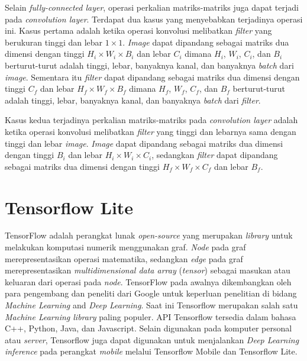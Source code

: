 Selain \textit{fully-connected layer}, operasi perkalian matriks-matriks juga dapat terjadi pada \textit{convolution layer}. Terdapat dua kasus yang menyebabkan terjadinya operasi ini. Kasus pertama adalah ketika operasi konvolusi melibatkan \textit{filter} yang berukuran tinggi dan lebar $1 \times 1$. \textit{Image} dapat dipandang sebagai matriks dua dimensi dengan tinggi $H_{i} \times W_{i} \times B_{i}$ dan lebar $C_{i}$ dimana $H_{i}$, $W_{i}$, $C_{i}$, dan $B_{i}$ berturut-turut adalah tinggi, lebar, banyaknya kanal, dan banyaknya \textit{batch} dari \textit{image}. Sementara itu \textit{filter} dapat dipandang sebagai matriks dua dimensi dengan tinggi $C_{f}$ dan lebar $H_{f} \times W_{f} \times B_{f}$ dimana $H_{f}$, $W_{f}$, $C_{f}$, dan $B_{f}$ berturut-turut adalah tinggi, lebar, banyaknya kanal, dan banyaknya \textit{batch} dari \textit{filter}.

Kasus kedua terjadinya perkalian matriks-matriks pada \textit{convolution layer} adalah ketika operasi konvolusi melibatkan \textit{filter} yang tinggi dan lebarnya sama dengan tinggi dan lebar \textit{image}. \textit{Image} dapat dipandang sebagai matriks dua dimensi dengan tinggi $B_{i}$ dan lebar $H_{i} \times W_{i} \times C_{i}$, sedangkan \textit{filter} dapat dipandang sebagai matriks dua dimensi dengan tinggi $H_{f} \times W_{f} \times C_{f}$ dan lebar $B_{f}$.

\section{Tensorflow Lite}
TensorFlow \cite{tensorflow} adalah perangkat lunak \textit{open-source} yang merupakan \textit{library} untuk melakukan komputasi numerik menggunakan graf. \textit{Node} pada graf merepresentasikan operasi matematika, sedangkan \textit{edge} pada graf merepresentasikan \textit{multidimensional data array} (\textit{tensor}) sebagai masukan atau keluaran dari operasi pada \textit{node}. TensorFlow pada awalnya dikembangkan oleh para pengembang dan peneliti dari Google untuk keperluan penelitian di bidang \textit{Machine Learning} and \textit{Deep Learning}. Saat ini Tensorflow merupakan salah satu \textit{Machine Learning library} paling populer. API Tensorflow tersedia dalam bahasa C++, Python, Java, dan Javascript. Selain digunakan pada komputer personal atau \textit{server}, Tensorflow juga dapat digunakan untuk menjalankan \textit{Deep Learning inference} pada perangkat \textit{mobile} melalui Tensorflow Mobile dan Tensorflow Lite.

